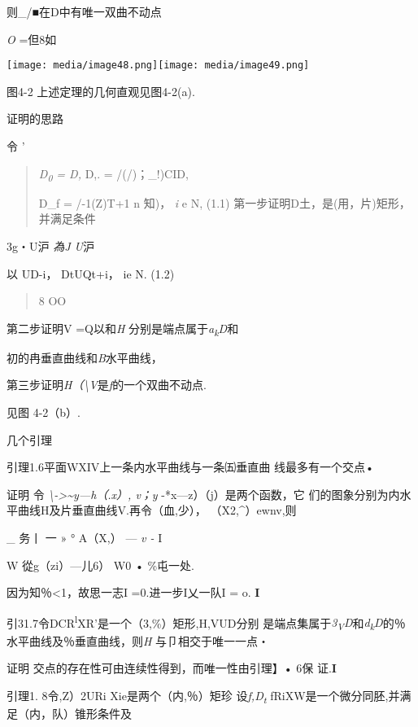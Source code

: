 \documentclass{article}
\begin{document}
则\_/■在D中有唯一双曲不动点

\emph{O} =但8如

\texttt{[image: media/image48.png]}\texttt{[image: media/image49.png]}

图4-2 上述定理的几何直观见图4-2(a).

证明的思路

令 '

\begin{quote}
\emph{D\textsubscript{0} = D,} D,. = /(/)；\_!)CID,

D\_f = /-1(Z)T+1 n 知)， \emph{i} e N, (1.1)
第一步证明D土，是(用，片)矩形，并满足条件
\end{quote}

3g・U沪 \emph{為J U}沪

以 UD-i， DtUQt+i， ie N. (1.2)

\begin{quote}
8 OO
\end{quote}

第二步证明V =Q以和\emph{H} 分别是端点属于\emph{a\textsubscript{k}D}和

初的冉垂直曲线和\emph{B}水平曲线，

第三步证明\emph{H（\textbackslash{}V}是\emph{f}的一个双曲不动点.

见图 4-2（b）.

几个引理

引理1.6平面WXIV上一条内水平曲线与一条㈤垂直曲 线最多有一个交点•

证明 令
\emph{\textbackslash{}-\textgreater{}\textasciitilde{}y---h（.x）, v；y}
\textbar{}-*x---z）（j）是两个函数，它
们的图象分别为内水平曲线H及片垂直曲线V.再令（血,少），
（X2,\^{}）ewnv,则

\_ 务丨 一 \textbar{}» ° A（X,） --- \emph{v -} I

W 從g（zi）---儿6）\textbar{} W0 • \%\textbar{}屯一处\textbar{}.

因为知％\textless{}1，故思一志I =0.进一步I乂一队I = o. \textbf{I}

引31.7令DCR\textsuperscript{l}XR'是一个（3,\%）矩形,H,VUD分别
是端点集属于\emph{3\textsubscript{V}D}和\emph{d\textsubscript{k}D}的％水平曲线及％垂直曲线，则\emph{H}
与卩相交于唯一一点・

证明 交点的存在性可由连续性得到，而唯一性由引理】• 6保 证.\textbf{I}

引理1. 8令,Z）2URi Xie是两个（内,％）矩珍 设\emph{f,D\textsubscript{t
}}fRiXW是一个微分同胚,并满足（内，队）锥形条件及
\end{document}
